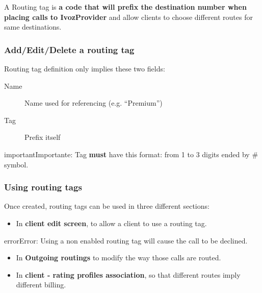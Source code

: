 \documentclass[letterpaper,10pt,spanish]{sphinxmanual}
\begin{document}
A Routing tag is \textbf{a code that will prefix the destination number when placing calls to IvozProvider} and allow clients
to choose different routes for same destinations.


\subsubsection{Add/Edit/Delete a routing tag}
\label{administration_portal/brand/routing/routing_tags:add-edit-delete-a-routing-tag}
Routing tag definition only implies these two fields:
\begin{description}
\item[{Name}] \leavevmode{}\label{administration_portal/brand/routing/routing_tags:term-name}
Name used for referencing (e.g. ``Premium'')

\item[{Tag}] \leavevmode{}\label{administration_portal/brand/routing/routing_tags:term-tag}
Prefix itself

\end{description}

\begin{notice}{important}{Importante:}
Tag \textbf{must} have this format: from 1 to 3 digits ended by \# symbol.
\end{notice}


\subsubsection{Using routing tags}
\label{administration_portal/brand/routing/routing_tags:using-routing-tags}
Once created, routing tags can be used in three different sections:
\begin{itemize}
\item {} 
In \textbf{client edit screen}, to allow a client to use a routing tag.

\end{itemize}

\begin{notice}{error}{Error:}
Using a non enabled routing tag will cause the call to be declined.
\end{notice}
\begin{itemize}
\item {} 
In \textbf{Outgoing routings} to modify the way those calls are routed.

\item {} 
In \textbf{client - rating profiles association}, so that different routes imply different billing.

\end{itemize}
\end{document}
